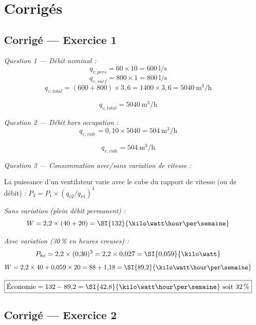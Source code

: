 \newpage
\section*{Corrigés}

\subsection*{Corrigé — Exercice 1}

\textit{Question 1 — Débit nominal :}
\[
  q_{v,pers} = 60 \times 10 = \SI{600}{\litre\per\second}
\]
\[
  q_{v,surf} = 800 \times 1 = \SI{800}{\litre\per\second}
\]
\[
  q_{v,total} = (600 + 800) \times 3{,}6 = 1400 \times 3{,}6 = \SI{5040}{\cubic\metre\per\hour}
\]

\[
  \boxed{q_{v,total} = \SI{5040}{\cubic\metre\per\hour}}
\]

\textit{Question 2 — Débit hors occupation :}
\[
  q_{v,vide} = 0{,}10 \times 5040 = \SI{504}{\cubic\metre\per\hour}
\]

\[
  \boxed{q_{v,vide} = \SI{504}{\cubic\metre\per\hour}}
\]

\textit{Question 3 — Consommation avec/sans variation de vitesse :}

\begin{methode}[title=Loi des similitudes — ventilateur]
La puissance d'un ventilateur varie avec le cube du rapport de vitesse (ou de débit) :
$P_2 = P_1 \times (q_{v2}/q_{v1})^3$
\end{methode}

\textit{Sans variation (plein débit permanent) :}
\[
  W = 2{,}2 \times (40 + 20) = \SI{132}{\kilo\watt\hour\per\semaine}
\]

\textit{Avec variation (30\,\% en heures creuses) :}
\[
  P_{hc} = 2{,}2 \times (0{,}30)^3 = 2{,}2 \times 0{,}027 = \SI{0{,}059}{\kilo\watt}
\]
\[
  W = 2{,}2 \times 40 + 0{,}059 \times 20 = 88 + 1{,}18 = \SI{89{,}2}{\kilo\watt\hour\per\semaine}
\]

\[
  \boxed{\text{Économie} = 132 - 89{,}2 = \SI{42{,}8}{\kilo\watt\hour\per\semaine} \text{ soit } 32\,\%}
\]


\subsection*{Corrigé — Exercice 2}

